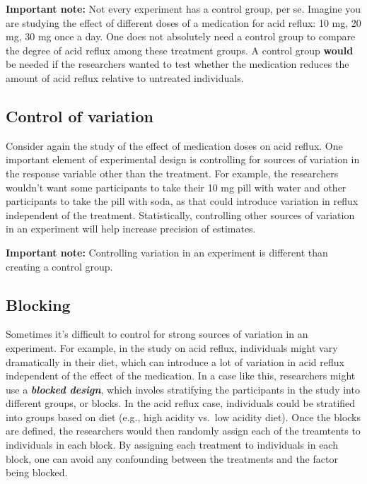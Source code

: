 \documentclass[
]{book}
\begin{document}
\textbf{Important note:} Not every experiment has a control group, per se. Imagine you are studying the effect of different doses of a medication for acid reflux: 10 mg, 20 mg, 30 mg once a day. One does not absolutely need a control group to compare the degree of acid reflux among these treatment groups. A control group \textbf{would} be needed if the researchers wanted to test whether the medication reduces the amount of acid reflux relative to untreated individuals.

\subsection{Control of variation}\label{control-of-variation}

Consider again the study of the effect of medication doses on acid reflux. One important element of experimental design is controlling for sources of variation in the response variable other than the treatment. For example, the researchers wouldn't want some participants to take their 10 mg pill with water and other participants to take the pill with soda, as that could introduce variation in reflux independent of the treatment. Statistically, controlling other sources of variation in an experiment will help increase precision of estimates.

\textbf{Important note:} Controlling variation in an experiment is different than creating a control group.

\subsection{Blocking}\label{blocking}

Sometimes it's difficult to control for strong sources of variation in an experiment. For example, in the study on acid reflux, individuals might vary dramatically in their diet, which can introduce a lot of variation in acid reflux independent of the effect of the medication. In a case like this, researchers might use a \textbf{\emph{blocked design}}, which involes stratifying the participants in the study into different groups, or blocks. In the acid reflux case, individuals could be stratified into groups based on diet (e.g., high acidity vs.~low acidity diet). Once the blocks are defined, the researchers would then randomly assign each of the treamtents to individuals in each block. By assigning each treatment to individuals in each block, one can avoid any confounding between the treatments and the factor being blocked.
\end{document}

